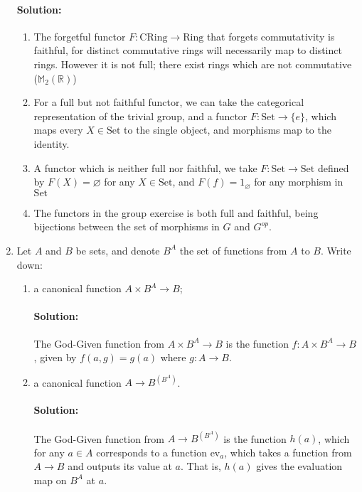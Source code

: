 \documentclass{article}
\begin{document}
\begin{enumerate}
        \paragraph{Solution: }
        \begin{enumerate}
            \item The forgetful functor $F:\mathrm{CRing}\to \mathrm{Ring}$ that forgets commutativity is faithful, for distinct commutative rings will necessarily map to distinct rings. However it is not full; there exist rings which are not commutative ($\mathbb{M}_2(\mathbb{R})$)
            \item For a full but not faithful functor, we can take the categorical representation of the trivial group, and a functor $F:\mathrm{Set}\to \{e\} $, which maps every $X\in \mathrm{Set}$ to the single object, and morphisms map to the identity.
            \item A functor which is neither full nor faithful, we take $F:\mathrm{Set}\to  \mathrm{Set}$ defined by $F(X)=\varnothing$ for any $X\in \mathrm{Set}$, and $F(f)=1_{\varnothing}$ for any morphism in $\mathrm{Set}$
            \item The functors in the group exercise is both full and faithful, being bijections between the set of morphisms in $G$ and $G^{op}$.
        \end{enumerate}

    \item Let $A$ and $B$ be sets, and denote $B^{A}$ the set of functions from $A$ to $B$. Write down:
        \begin{enumerate}
            \item a canonical function $A\times B^A\to B$;
                \paragraph{Solution: }The God-Given function from $A\times B^{A}\to B$ is the function $f:A\times B^{A}\to B$, given by $f(a,g)=g(a)$ where $g:A\to B$.
            \item a canonical function $A \to B^{(B^A)}$.
                \paragraph{Solution: }The God-Given function from $A\to B^{(B^{A})}$ is the function $h(a)$, which for any $a\in A$ corresponds to a function $\mathrm{ev}_a$, which takes a function from $A \to B$ and outputs its value at $a$. That is, $h(a)$ gives the evaluation map on $B^{A}$ at $a$.
        \end{enumerate}


\end{enumerate}
\end{document}
